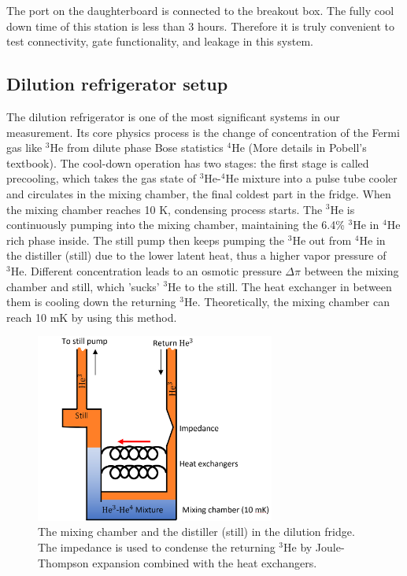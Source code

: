 The port on the daughterboard is connected to the breakout box. The fully cool down time of this station is less than 3 hours. Therefore it is truly convenient to test connectivity, gate functionality, and leakage in this system.

\subsection{Dilution refrigerator setup}

The dilution refrigerator is one of the most significant systems in our measurement. Its core physics process is the change of concentration of the Fermi gas like $^3\text{He}$ from dilute phase Bose statistics $^4\text{He}$ (More details in Pobell's textbook\cite{RN69}). The cool-down operation has two stages: the first stage is called precooling, which takes the gas state of $^3\text{He}$-$^4\text{He}$ mixture into a pulse tube cooler and circulates in the mixing chamber, the final coldest part in the fridge. When the mixing chamber reaches 10 K, condensing process starts. The $^3\text{He}$ is continuously pumping into the mixing chamber, maintaining the 6.4\% $^3\text{He}$ in $^4\text{He}$ rich phase inside. The still pump then keeps pumping the $^3\text{He}$ out from $^4\text{He}$ in the distiller (still) due to the lower latent heat, thus a higher vapor pressure of $^3\text{He}$. Different concentration leads to an osmotic pressure $\Delta \pi$ between the mixing chamber and still, which 'sucks' $^3\text{He}$ to the still. The heat exchanger in between them is cooling down the returning $^3\text{He}$. Theoretically, the mixing chamber can reach 10 mK by using this method.

\begin{figure}[h!]
    \centering
    \includegraphics[width=0.7\textwidth]{Pic/MixingChamber.png}
    \caption{The mixing chamber and the distiller (still) in the dilution fridge. The impedance is used to condense the returning $^3\text{He}$ by Joule-Thompson expansion combined with the heat exchangers.}
    \label{fig:my_label}
\end{figure}

